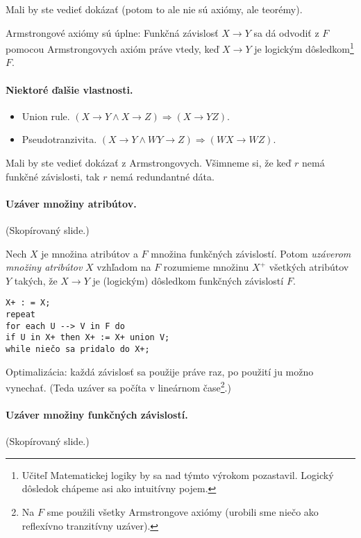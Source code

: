 \documentclass[10pt,a4paper]{article}
\begin{document}
Mali by ste vedieť dokázať (potom to ale nie sú axiómy, ale teorémy). 
 
Armstrongové axiómy sú úplne: 
Funkčná závislosť $X \rightarrow Y$ sa dá odvodiť z $F$ pomocou
Armstrongovych axióm práve vtedy, keď $X \rightarrow Y$ je logickým
dôsledkom\footnote{Učiteľ Matematickej logiky by sa nad týmto výrokom pozastavil. Logický dôsledok chápeme asi ako intuitívny pojem.} $F$.

 
\paragraph{Niektoré ďalšie vlastnosti.}
 
\begin{itemize}
\item Union rule. $(X \rightarrow Y \wedge X \rightarrow Z) \Rightarrow (X \rightarrow YZ)$.
\item Pseudotranzivita. $(X \rightarrow Y \wedge WY \rightarrow Z) \Rightarrow (WX \rightarrow WZ)$.
\end{itemize}

Mali by ste vedieť dokázať z Armstrongovych.
Všimneme si, že keď $r$ nemá funkčné závislosti, tak $r$ nemá redundantné dáta.  

\paragraph{Uzáver množiny atribútov.}
(Skopírovaný slide.)

Nech $X$ je množina atribútov a $F$ množina funkčných
závislostí. Potom \emph{uzáverom množiny atribútov} $X$ vzhľadom na $F$
rozumieme množinu $X^+$ všetkých atribútov $Y$ takých, že $X \rightarrow Y$ je
(logickým) dôsledkom funkčných závislostí $F$. 
 
\begin{verbatim}
X+ : = X;
repeat
for each U --> V in F do
if U in X+ then X+ := X+ union V;
while niečo sa pridalo do X+;
\end{verbatim}

Optimalizácia: každá závislosť sa použije práve raz, po použití ju
možno vynechať. (Teda uzáver sa počíta v lineárnom čase\footnote{
Na $F$ sme použili všetky Armstrongove axiómy (urobili sme niečo ako reflexívno tranzitívny uzáver). 
}.)

\paragraph{Uzáver množiny funkčných závislostí.}
(Skopírovaný slide.)
\end{document}
